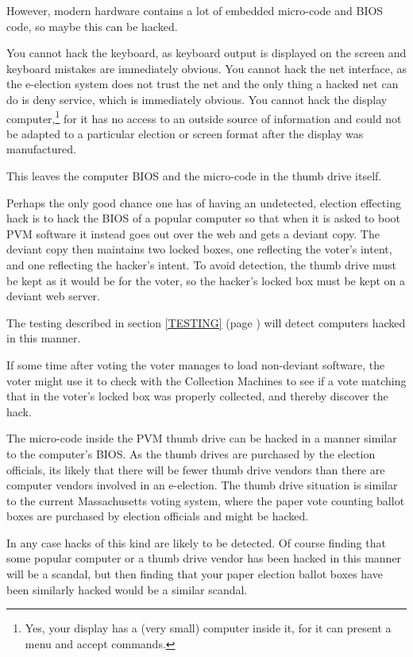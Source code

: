 \documentclass[12pt]{article}
\begin{document}
However, modern hardware contains a lot of embedded micro-code and
BIOS code, so maybe this can be hacked.

You cannot hack the keyboard, as keyboard output is displayed on
the screen and keyboard mistakes are immediately obvious.  You
cannot hack the net interface, as the e-election system does not
trust the net and the only thing a hacked net can do is deny
service, which is immediately obvious.  You cannot hack the
display computer,\footnote{Yes, your display has a (very small)
computer inside it, for it can present a menu and accept commands.}
for it has no access to an outside source of
information and could not be adapted to a particular election
or screen format after the display was manufactured.

This leaves the computer BIOS and the micro-code in the thumb
drive itself.

Perhaps the only good chance one has of having an undetected, 
election effecting hack is to hack the BIOS of a popular computer
so that when it is asked to boot PVM software it instead goes out
over the web and gets a deviant copy.  The deviant copy then maintains
two locked boxes, one reflecting the voter's intent, and one reflecting
the hacker's intent.  To avoid detection, the thumb drive must be
kept as it would be for the voter, so the hacker's locked box must
be kept on a deviant web server.

The testing described in section \ref{TESTING} (page \pageref{TESTING})
will detect computers hacked in this manner.

If some time after voting the voter manages to load non-deviant
software, the voter might use it to check with the Collection
Machines to see if a vote matching that in the voter's locked box
was properly collected, and thereby discover the hack.

The micro-code inside the PVM thumb drive can be hacked
in a manner similar to the computer's BIOS.  As the thumb drives
are purchased by the election officials, its likely that there
will be fewer thumb drive vendors than there are computer vendors
involved in an e-election.
The thumb drive situation is similar to the current
Massachusetts voting system, where the paper vote counting ballot boxes
are purchased by election officials and might be hacked.

In any case hacks of this kind are likely to be detected.
Of course finding that some popular computer or a thumb drive
vendor has been hacked in this
manner will be a scandal, but then finding that your paper election
ballot boxes have been similarly hacked would be a similar scandal.
\end{document}
